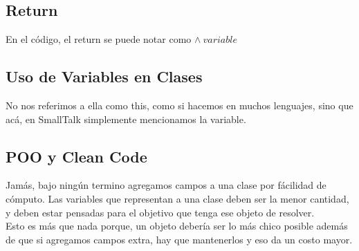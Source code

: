 \documentclass[10pt,a4paper]{article}
\begin{document}
\subsection*{Return}
En el código, el return se puede notar como $\land \ variable$
\subsection*{Uso de Variables en Clases}
No nos referimos a ella como this, como si hacemos en muchos lenguajes, sino que acá, en SmallTalk simplemente mencionamos la variable. 
\subsection*{POO y Clean Code}
Jamás, bajo ningún termino agregamos campos a una clase por fácilidad de cómputo. Las variables que representan a una clase deben ser la menor cantidad, y deben estar pensadas para el objetivo que tenga ese objeto de resolver. \\
Esto es más que nada porque, un objeto debería ser lo más chico posible además de que si agregamos campos extra, hay que mantenerlos y eso da un costo mayor. 
\end{document}
